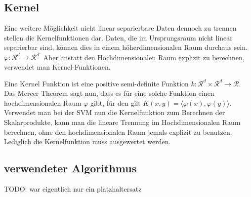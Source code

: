 \documentclass{scrartcl}
\begin{document}
\subsection{Kernel}
Eine weitere Möglichkeit nicht linear separierbare Daten dennoch zu trennen stellen die Kernelfunktionen dar.
Daten, die im Ursprungsraum nicht linear separierbar sind, können dies in einem höherdimensionalen Raum durchaus sein. $\varphi : \mathcal R^d \rightarrow \mathcal R^{d'}$
Aber anstatt den Hochdimensionalen Raum explizit zu berechnen, verwendet man Kernel-Funktionen.
 
Eine Kernel Funktion ist eine positive semi-definite Funktion $k: \mathcal R^d \times \mathcal R^d \rightarrow \mathcal R$.
Das Mercer Theorem sagt nun, dass es für eine solche Funktion einen hochdimensionalen Raum $\varphi$ gibt, für den gilt $K(x,y) = \langle \varphi(x), \varphi(y) \rangle$.
Verwendet man bei der SVM nun die Kernelfunktion zum Berechnen der Skalarprodukte, kann man die lineare Trennung im Hochdimensionalen Raum berechnen, ohne den hochdimensionalen Raum jemals explizit zu benutzen.  Lediglich die Kernelfunktion muss ausgewertet werden.

\subsection{verwendeter Algorithmus}
TODO: war eigentlich nur ein platzhaltersatz
\end{document}
